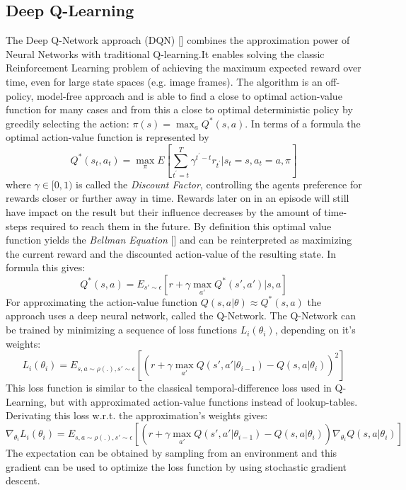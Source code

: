 \subsection{Deep Q-Learning}
\nocite{mnih2015human}
\label{sec:DQN}
The Deep Q-Network approach (DQN) [\cite{mnih2013playing}] combines the approximation power of Neural Networks with traditional Q-learning.It enables solving the classic Reinforcement Learning problem of achieving the maximum expected reward over time, even for large state spaces (e.g. image frames). The algorithm is an off-policy, model-free approach and is able to find a close to optimal action-value function for many cases and from this a close to optimal deterministic policy by greedily selecting the action: $\pi(s)=\max_{a}Q^*(s,a)$. In terms of a formula the optimal action-value function is represented by
\[ 
Q^*(s_t,a_t)=\max_\pi E \left[
\sum_{t^{'}=t}^{T}\gamma^{t^{'}-t}r_{t^{'}}|s_t=s,
a_t=a, \pi \right] 
\]
 where $\gamma\in[0,1)$ is called the \textit{Discount Factor}, controlling the agents preference for rewards closer or further away in time. Rewards later on in an episode will still have impact on the result but their influence decreases by the amount of time-steps required to reach them in the future.
By definition this optimal value function yields the \textit{Bellman Equation} [\cite{sutton2018reinforcement}] and can be reinterpreted as maximizing the current reward and the discounted action-value of the resulting state. In formula this gives:
\[
Q^*(s,a) = E_{s'\sim\epsilon}\left[
r + \gamma \max_{a'}Q^*(s',a')|s,a \right]
\]
For approximating the action-value function $Q(s,a|\theta)\approx Q^*(s,a)$ the approach uses a deep neural network, called the Q-Network.
The Q-Network can be trained by minimizing a sequence of loss functions $L_i(\theta_i)$, depending on it's weights:
\[
L_i(\theta_i)=E_{s,a\sim\rho(.),s'\sim\epsilon}
\left[\left(r+\gamma \max_{a'} Q(s', 
a'|\theta_{i-1})-Q(s,a|\theta_i)\right)^2\right] 
\]
This loss function is similar to the classical temporal-difference loss used in Q-Learning, but with approximated action-value functions instead of lookup-tables. Derivating this loss w.r.t. the approximation's weights gives:
\[
\nabla_{\theta_i}L_i(\theta_i)=E_{s,a\sim\rho(.),s'\sim\epsilon}
\left[\left(r+\gamma \max_{a'} Q(s', 
a'|\theta_{i-1})-Q(s,a|\theta_i)\right)\nabla_{\theta_i}Q(s,a|\theta_i)\right] 
\]
The expectation can be obtained by sampling from an environment and this gradient can be used to optimize the loss function by using stochastic gradient descent.\\
